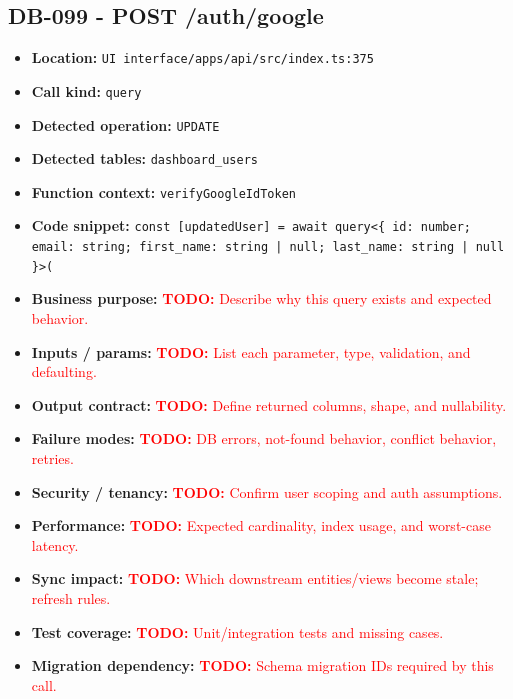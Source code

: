 \documentclass[11pt]{article}
\newcommand{\todoitem}[1]{\textcolor{red}{\textbf{TODO:} #1}}
\begin{document}
\subsection{DB-099 - POST /auth/google}
\begin{itemize}[leftmargin=1.5em]
\item \textbf{Location:} \texttt{UI interface/apps/api/src/index.ts:375}
\item \textbf{Call kind:} \texttt{query}
\item \textbf{Detected operation:} \texttt{UPDATE}
\item \textbf{Detected tables:} \texttt{dashboard\_users}
\item \textbf{Function context:} \texttt{verifyGoogleIdToken}
\item \textbf{Code snippet:} \texttt{const [updatedUser] = await query<\{ id: number; email: string; first\_name: string | null; last\_name: string | null \}>(}
\item \textbf{Business purpose:} \todoitem{Describe why this query exists and expected behavior.}
\item \textbf{Inputs / params:} \todoitem{List each parameter, type, validation, and defaulting.}
\item \textbf{Output contract:} \todoitem{Define returned columns, shape, and nullability.}
\item \textbf{Failure modes:} \todoitem{DB errors, not-found behavior, conflict behavior, retries.}
\item \textbf{Security / tenancy:} \todoitem{Confirm user scoping and auth assumptions.}
\item \textbf{Performance:} \todoitem{Expected cardinality, index usage, and worst-case latency.}
\item \textbf{Sync impact:} \todoitem{Which downstream entities/views become stale; refresh rules.}
\item \textbf{Test coverage:} \todoitem{Unit/integration tests and missing cases.}
\item \textbf{Migration dependency:} \todoitem{Schema migration IDs required by this call.}
\end{itemize}
\end{document}
